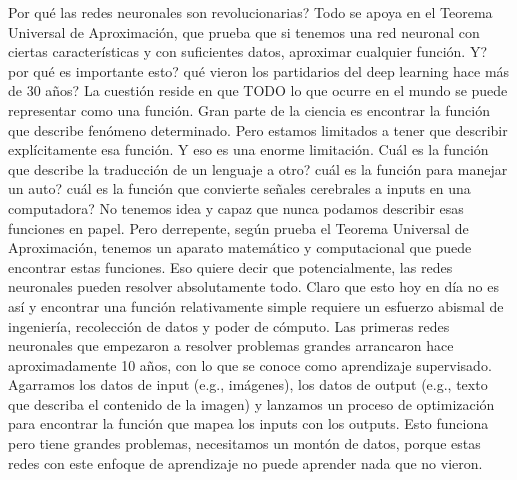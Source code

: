 Por qué las redes neuronales son revolucionarias?
Todo se apoya en el Teorema Universal de Aproximación, que prueba que si 
tenemos una red neuronal con ciertas características y con suficientes datos, 
aproximar cualquier función. Y? por qué es importante esto? qué vieron los partidarios del 
deep learning hace más de 30 años? La cuestión reside en que TODO lo que ocurre en el mundo
se puede representar como una función. Gran parte de la ciencia es encontrar la función que describe 
fenómeno determinado. Pero estamos limitados a tener que describir explícitamente esa función. 
Y eso es una enorme limitación. Cuál es la función que describe la traducción de un lenguaje a otro?
cuál es la función para manejar un auto? cuál es la función que convierte señales cerebrales a inputs
en una computadora? No tenemos idea y capaz que nunca podamos describir esas funciones en papel. 
Pero derrepente, según prueba el Teorema Universal de Aproximación, tenemos un aparato matemático y
computacional que puede encontrar estas funciones. Eso quiere decir que potencialmente, las redes 
neuronales pueden resolver absolutamente todo. Claro que esto hoy en día no es así y encontrar una 
función relativamente simple requiere un esfuerzo abismal de ingeniería, recolección de datos y poder 
de cómputo. Las primeras redes neuronales que empezaron a resolver problemas grandes arrancaron hace
aproximadamente 10 años, con lo que se conoce como aprendizaje supervisado. Agarramos los datos de
input (e.g., imágenes), los datos de output (e.g., texto que describa el contenido de la imagen) y 
lanzamos un proceso de optimización para encontrar la función que mapea los inputs con los outputs. 
Esto funciona pero tiene grandes problemas, necesitamos un montón de datos, porque estas redes
con este enfoque de aprendizaje no puede aprender nada que no vieron. 

